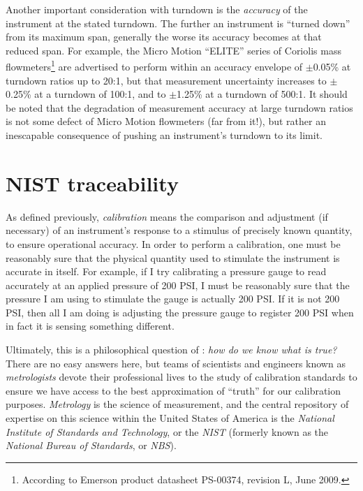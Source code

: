 \vskip 10pt

Another important consideration with turndown is the \textit{accuracy} of the instrument at the stated turndown.  The further an instrument is ``turned down'' from its maximum span, generally the worse its accuracy becomes at that reduced span.  For example, the Micro Motion ``ELITE'' series of Coriolis mass flowmeters\footnote{According to Emerson product datasheet PS-00374, revision L, June 2009.} are advertised to perform within an accuracy envelope of $\pm$0.05\% at turndown ratios up to 20:1, but that measurement uncertainty increases to $\pm$0.25\% at a turndown of 100:1, and to $\pm$1.25\% at a turndown of 500:1.  It should be noted that the degradation of measurement accuracy at large turndown ratios is not some defect of Micro Motion flowmeters (far from it!), but rather an inescapable consequence of pushing an instrument's turndown to its limit.  





\filbreak
\section{NIST traceability}

As defined previously, \textit{calibration} means the comparison and adjustment (if necessary) of an instrument's response to a stimulus of precisely known quantity, to ensure operational accuracy.  In order to perform a calibration, one must be reasonably sure that the physical quantity used to stimulate the instrument is accurate in itself.  For example, if I try calibrating a pressure gauge to read accurately at an applied pressure of 200 PSI, I must be reasonably sure that the pressure I am using to stimulate the gauge is actually 200 PSI.  If it is not 200 PSI, then all I am doing is adjusting the pressure gauge to register 200 PSI when in fact it is sensing something different.

Ultimately, this is a philosophical question of : \textit{how do we know what is true?}  There are no easy answers here, but teams of scientists and engineers known as \textit{metrologists} devote their professional lives to the study of calibration standards to ensure we have access to the best approximation of ``truth'' for our calibration purposes.  \textit{Metrology} is the science of measurement, and the central repository of expertise on this science within the United States of America is the \textit{National Institute of Standards and Technology}, or the \textit{NIST} (formerly known as the \textit{National Bureau of Standards}, or \textit{NBS}).           

